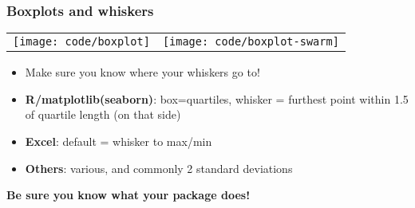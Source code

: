\documentclass{beamer}
\newcommand{\key}[1]{\textcolor{keyred}{{\bf #1}}}
\begin{document}
\begin{frame}
\frametitle{Boxplots and whiskers}
\begin{tabular}{@{}cc}
\begin{minipage}{0.5\textwidth}
\texttt{[image: code/boxplot]}
\end{minipage}&
\begin{minipage}{0.5\textwidth}
\texttt{[image: code/boxplot-swarm]}
\end{minipage}
\end{tabular}
\begin{itemize}
\item Make sure you know where your whiskers go to!
\item
\key{R/matplotlib(seaborn)}: box=quartiles, whisker = furthest point within 1.5 of quartile length (on that side)
\item
\key{Excel}: default = whisker to max/min
\item
\key{Others}: various, and commonly 2 standard deviations
%
\end{itemize}
\begin{center}
\key{Be sure you know what your package does!}
\end{center}
\end{frame}

\end{document}
